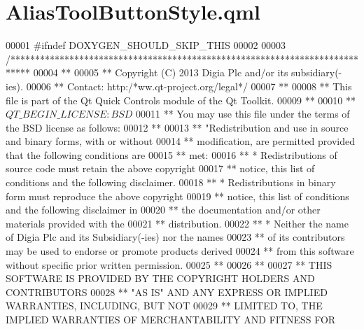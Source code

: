 \hypertarget{AliasToolButtonStyle_8qml}{\section{Alias\-Tool\-Button\-Style.\-qml}
\label{AliasToolButtonStyle_8qml}
}

\begin{DoxyCode}
00001 \textcolor{preprocessor}{#ifndef DOXYGEN\_SHOULD\_SKIP\_THIS}
00002 \textcolor{preprocessor}{}
00003 \textcolor{comment}{/****************************************************************************}
00004 \textcolor{comment}{**}
00005 \textcolor{comment}{** Copyright (C) 2013 Digia Plc and/or its subsidiary(-ies).}
00006 \textcolor{comment}{** Contact: http:/*ww.qt-project.org/legal*/}
00007 **
00008 ** This file is part of the Qt Quick Controls module of the Qt Toolkit.
00009 **
00010 ** $QT\_BEGIN\_LICENSE:BSD$
00011 ** You may use \textcolor{keyword}{this} file under the terms of the BSD license as follows:
00012 **
00013 ** \textcolor{stringliteral}{"Redistribution and use in source and binary forms, with or without}
00014 \textcolor{stringliteral}{** modification, are permitted provided that the following conditions are}
00015 \textcolor{stringliteral}{** met:}
00016 \textcolor{stringliteral}{**   * Redistributions of source code must retain the above copyright}
00017 \textcolor{stringliteral}{**     notice, this list of conditions and the following disclaimer.}
00018 \textcolor{stringliteral}{**   * Redistributions in binary form must reproduce the above copyright}
00019 \textcolor{stringliteral}{**     notice, this list of conditions and the following disclaimer in}
00020 \textcolor{stringliteral}{**     the documentation and/or other materials provided with the}
00021 \textcolor{stringliteral}{**     distribution.}
00022 \textcolor{stringliteral}{**   * Neither the name of Digia Plc and its Subsidiary(-ies) nor the names}
00023 \textcolor{stringliteral}{**     of its contributors may be used to endorse or promote products derived}
00024 \textcolor{stringliteral}{**     from this software without specific prior written permission.}
00025 \textcolor{stringliteral}{**}
00026 \textcolor{stringliteral}{**}
00027 \textcolor{stringliteral}{** THIS SOFTWARE IS PROVIDED BY THE COPYRIGHT HOLDERS AND CONTRIBUTORS}
00028 \textcolor{stringliteral}{** "}AS IS\textcolor{stringliteral}{" AND ANY EXPRESS OR IMPLIED WARRANTIES, INCLUDING, BUT NOT}
00029 \textcolor{stringliteral}{** LIMITED TO, THE IMPLIED WARRANTIES OF MERCHANTABILITY AND FITNESS FOR}

\end{DoxyCode}
